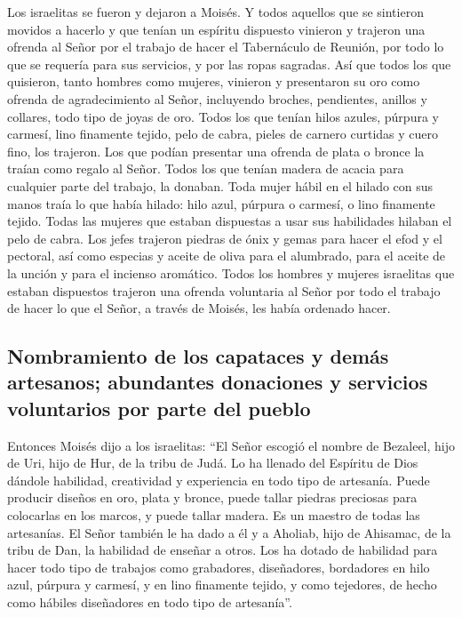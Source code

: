  Los israelitas se fueron y dejaron a Moisés.
 Y todos aquellos que se sintieron movidos a hacerlo y
que tenían un espíritu dispuesto vinieron y trajeron una ofrenda al
Señor por el trabajo de hacer el Tabernáculo de Reunión, por todo lo que
se requería para sus servicios, y por las ropas sagradas.
 Así que todos los que quisieron, tanto hombres como
mujeres, vinieron y presentaron su oro como ofrenda de agradecimiento al
Señor, incluyendo broches, pendientes, anillos y collares, todo tipo de
joyas de oro.  Todos los que tenían hilos azules, púrpura
y carmesí, lino finamente tejido, pelo de cabra, pieles de carnero
curtidas y cuero fino, los trajeron.  Los que podían
presentar una ofrenda de plata o bronce la traían como regalo al Señor.
Todos los que tenían madera de acacia para cualquier parte del trabajo,
la donaban.  Toda mujer hábil en el hilado con sus manos
traía lo que había hilado: hilo azul, púrpura o carmesí, o lino
finamente tejido.  Todas las mujeres que estaban
dispuestas a usar sus habilidades hilaban el pelo de cabra.
 Los jefes trajeron piedras de ónix y gemas para hacer el
efod y el pectoral,  así como especias y aceite de oliva
para el alumbrado, para el aceite de la unción y para el incienso
aromático.  Todos los hombres y mujeres israelitas que
estaban dispuestos trajeron una ofrenda voluntaria al Señor por todo el
trabajo de hacer lo que el Señor, a través de Moisés, les había ordenado
hacer.

\hypertarget{nombramiento-de-los-capataces-y-demuxe1s-artesanos-abundantes-donaciones-y-servicios-voluntarios-por-parte-del-pueblo}{%
\subsection{Nombramiento de los capataces y demás artesanos; abundantes
donaciones y servicios voluntarios por parte del
pueblo}\label{nombramiento-de-los-capataces-y-demuxe1s-artesanos-abundantes-donaciones-y-servicios-voluntarios-por-parte-del-pueblo}}

 Entonces Moisés dijo a los israelitas: ``El Señor
escogió el nombre de Bezaleel, hijo de Uri, hijo de Hur, de la tribu de
Judá.  Lo ha llenado del Espíritu de Dios dándole
habilidad, creatividad y experiencia en todo tipo de artesanía.
 Puede producir diseños en oro, plata y bronce,
 puede tallar piedras preciosas para colocarlas en los
marcos, y puede tallar madera. Es un maestro de todas las artesanías.
 El Señor también le ha dado a él y a Aholiab, hijo de
Ahisamac, de la tribu de Dan, la habilidad de enseñar a otros.
 Los ha dotado de habilidad para hacer todo tipo de
trabajos como grabadores, diseñadores, bordadores en hilo azul, púrpura
y carmesí, y en lino finamente tejido, y como tejedores, de hecho como
hábiles diseñadores en todo tipo de artesanía''.

